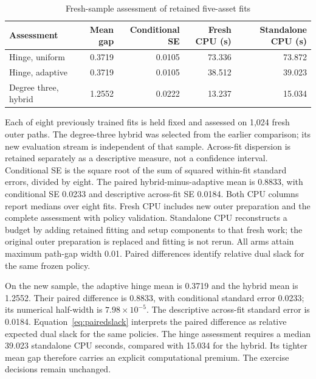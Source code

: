 \documentclass[11pt]{article}
\begin{document}
\begin{table}[!htbp]
\centering\small
\caption{Fresh-sample assessment of retained five-asset fits}\label{tab:revision-frozen-extension}
\begin{tabular}{@{}lrrrr@{}}
\toprule
Assessment & Mean gap & Conditional SE & Fresh CPU (s) & Standalone CPU (s) \\
\midrule
Hinge, uniform & 0.3719 & 0.0105 & 73.336 & 73.872 \\
Hinge, adaptive & 0.3719 & 0.0105 & 38.512 & 39.023 \\
Degree three, hybrid & 1.2552 & 0.0222 & 13.237 & 15.034 \\
\bottomrule
\end{tabular}
\par\smallskip\begin{minipage}{\textwidth}\footnotesize Each of eight previously trained fits is held fixed and assessed on 1,024 fresh outer paths. The degree-three hybrid was selected from the earlier comparison; its new evaluation stream is independent of that sample. Across-fit dispersion is retained separately as a descriptive measure, not a confidence interval. Conditional SE is the square root of the sum of squared within-fit standard errors, divided by eight. The paired hybrid-minus-adaptive mean is 0.8833, with conditional SE 0.0233 and descriptive across-fit SE 0.0184. Both CPU columns report medians over eight fits. Fresh CPU includes new outer preparation and the complete assessment with policy validation. Standalone CPU reconstructs a budget by adding retained fitting and setup components to that fresh work; the original outer preparation is replaced and fitting is not rerun. All arms attain maximum path-gap width 0.01. Paired differences identify relative dual slack for the same frozen policy.\end{minipage}
\end{table}

On the new sample, the adaptive hinge mean is 0.3719 and the hybrid mean is 1.2552. Their paired difference is 0.8833, with conditional standard error 0.0233; its numerical half-width is $7.98\times10^{-5}$. The descriptive across-fit standard error is 0.0184. Equation~\eqref{eq:pairedslack} interprets the paired difference as relative expected dual slack for the same policies. The hinge assessment requires a median 39.023 standalone CPU seconds, compared with 15.034 for the hybrid. Its tighter mean gap therefore carries an explicit computational premium. The exercise decisions remain unchanged.
\end{document}
